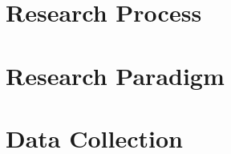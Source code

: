 \section{Research Process}
\label{sec:researchProcess}






\section{Research Paradigm}
\label{sec:researchParadigm}



\section{Data Collection}
\label{sec:dataCollection}



